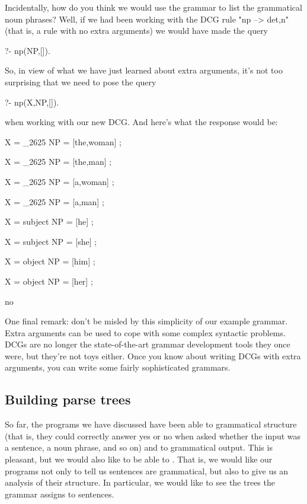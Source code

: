 Incidentally, how do you think we would use the grammar to list the
grammatical noun phrases?  Well, if we had been working with the DCG
rule "np --> det,n" (that is, a rule with no extra arguments)
we would have made the query
\begin{LPNcodedisplay}
?- np(NP,[]).
\end{LPNcodedisplay}
So, in view of what we have just learned about extra arguments, it's
not too surprising that we need to pose the query
\begin{LPNcodedisplay}
?- np(X,NP,[]).
\end{LPNcodedisplay}
when working with our new DCG. And here's what the response would be:
\begin{LPNcodedisplay}
X = _2625
NP = [the,woman] ;

X = _2625
NP = [the,man] ;

X = _2625
NP = [a,woman] ;

X = _2625
NP = [a,man] ;

X = subject
NP = [he] ;

X = subject
NP = [she] ;

X = object
NP = [him] ;

X = object
NP = [her] ;

no
\end{LPNcodedisplay}




One final remark: don't be misled by this simplicity of our example
grammar.  Extra arguments can be used to cope with some complex
syntactic problems.  DCGs are no longer the state-of-the-art grammar
development tools they once were, but they're not toys either.  Once
you know about writing DCGs with extra arguments, you can write some
fairly sophisticated grammars.

\subsection*{Building parse trees}\label{SUBSEC.L8.PARSE.TREES}



So far, the programs we have discussed have been able to
grammatical structure (that is, they could correctly
answer yes  or  no when asked whether the input was a sentence,
a noun phrase, and so on) and to  grammatical
output.  This is pleasant, but we would also like to be able to
.  That is, we would like our programs not only
to tell us  sentences are grammatical, but also to give
us an analysis of their structure.  In particular, we would like to
see the trees the grammar assigns to sentences.

